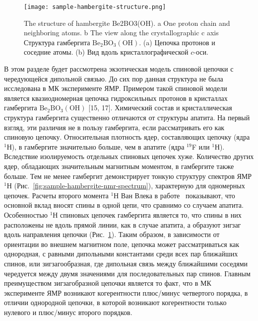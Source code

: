 \begin{figure}
  \centering
  \texttt{[image: sample-hambergite-structure.png]}
  \caption{
    The structure of hambergite Be2BO3(OH). a One proton chain and neighboring atoms. b The view along the crystallographic c axis
    Структура гамбергита $\mathrm{Be}_2\mathrm{BO}_3(\mathrm{OH})$.
    (a) Цепочка протонов и соседние атомы.
    (b) Вид вдоль кристаллографической $c$-оси.
  }
  \label{fig:sample-hambergite-structure}
\end{figure}
В этом разделе будет рассмотрена экзотическая модель спиновой цепочки с чередующейся дипольной связью.
До сих пор данная структура не была исследована в МК эксперименте ЯМР.
Примером такой спиновой модели является квазиодномерная цепочка гидроксильных протонов в кристаллах гамбергита $\mathrm{Be}_2\mathrm{BO}_3(\mathrm{OH})$ [15, 17].
Химический состав и кристаллическая структура гамбергита существенно отличаются от структуры апатита.
На первый взгляд, эти различия не в пользу гамбергита,
если рассматривать его как спиновую цепочку.
Относительная плотность ядер, составляющих цепочку (ядра $^1$Н),
в гамбергите значительно больше, чем в апатите (ядра $^{19}$F или $^1$Н).
Вследствие изолируемость отдельных спиновых цепочек хуже.
Количество других ядер,
обладающих значительным магнитным   моментом,
в гамбергите также больше.
Тем не менее гамбергит демонстрирует тонкую структуру спектров ЯМР $^1$Н (Рис.~\ref{fig:sample-hambergite-nmr-spectrum}),
характерную для одномерных цепочек.
Расчеты второго момента $^1$Н Ван Влека в работе~\cite{Bochkin2020jmr} показывают,
что основной вклад вносят спины в одной цепи,
что сравнимо со случаем апатита.
Особенностью $^1$Н спиновых цепочек гамбергита является то,
что спины в них расположены не вдоль прямой линии,
как в случае апатита,
а образуют зигзаг вдоль направления цепочки (Рис.~\ref{fig:sample-hambergite-structure}).
Таким образом, в зависимости от ориентации во внешнем магнитном поле,
цепочка может рассматриваться как однородная,
с равными дипольными константами среди всех пар ближайших спинов,
или зигзагообразная,
где дипольная связь между ближайшими соседями чередуется между двумя значениями для последовательных пар спинов.
Главным преимуществом зигзагобразной цепочки является то факт,
что в МК эксперименте ЯМР возникают когерентности плюс/минус четвертого порядка,
в отличии однородной цепочки, в которой возникают когерентности только нулевого и плюс/минус второго порядков.

